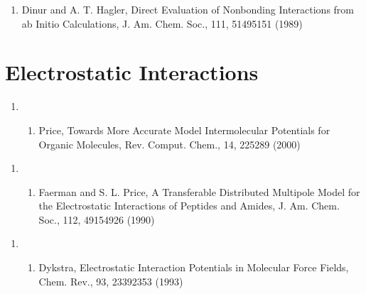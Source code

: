 \documentclass[letterpaper,11pt,english]{sphinxmanual}
\begin{document}
\begin{enumerate}
%
\setcounter{enumi}{20}
\item {} 
Dinur and A. T. Hagler, Direct Evaluation of Nonbonding Interactions from ab Initio Calculations, J. Am. Chem. Soc., 111, 5149\sphinxhyphen{}5151 (1989)

\end{enumerate}


\section{Electrostatic Interactions}
\label{\detokenize{text/references:electrostatic-interactions}}\begin{enumerate}
%
\setcounter{enumi}{18}
\item {} \begin{enumerate}
%
\setcounter{enumii}{11}
\item {} 
Price, Towards More Accurate Model Intermolecular Potentials for Organic Molecules, Rev. Comput. Chem., 14, 225\sphinxhyphen{}289 (2000)

\end{enumerate}

\end{enumerate}
\begin{enumerate}
%
\setcounter{enumi}{2}
\item {} \begin{enumerate}
%
\setcounter{enumii}{7}
\item {} 
Faerman and S. L. Price, A Transferable Distributed Multipole Model for the Electrostatic Interactions of Peptides and Amides, J. Am. Chem. Soc., 112, 4915\sphinxhyphen{}4926 (1990)

\end{enumerate}

\end{enumerate}
\begin{enumerate}
%
\setcounter{enumi}{2}
\item {} \begin{enumerate}
%
\setcounter{enumii}{4}
\item {} 
Dykstra, Electrostatic Interaction Potentials in Molecular Force Fields, Chem. Rev., 93, 2339\sphinxhyphen{}2353 (1993)

\end{enumerate}

\end{enumerate}
\end{document}

